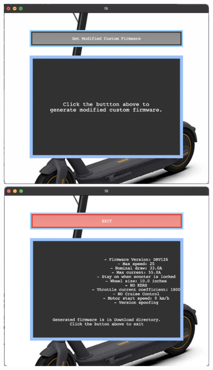 \documentclass[binding=0.6cm,LaM,noexaminfo]{sapthesis}
\begin{document}
\begin{figure}[!htp]
\centering
\begin{minipage}{.5\textwidth}
  \centering
  \includegraphics[width=.9\linewidth]{images/gui1.png}
\end{minipage}%
\begin{minipage}{.5\textwidth}
  \centering
  \includegraphics[width=.9\linewidth]{images/gui2.png}
\end{minipage}
\label{fig:test2}
\end{figure}
\end{document}
